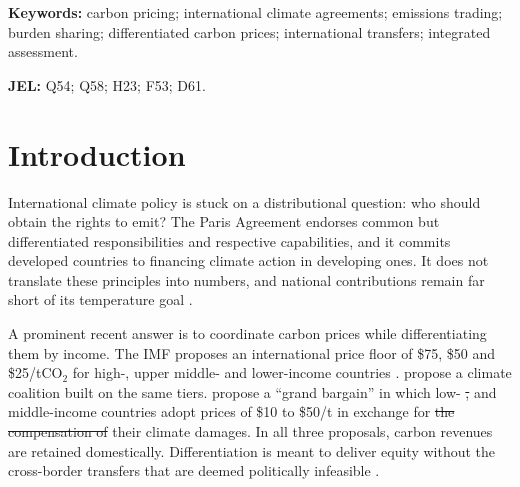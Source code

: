 \documentclass[12pt,english]{article}
\newif\ifblind
\theoremstyle{remark}
\providecommand{\DIFaddtex}[1]{{\protect\color{blue}\uwave{#1}}} %
\providecommand{\DIFdeltex}[1]{{\protect\color{red}\sout{#1}}}                      %
\providecommand{\DIFaddbegin}{} %
\providecommand{\DIFaddend}{} %
\providecommand{\DIFdelbegin}{} %
\providecommand{\DIFdelend}{} %
\providecommand{\DIFadd}[1]{\texorpdfstring{\DIFaddtex{#1}}{#1}} %
\providecommand{\DIFdel}[1]{\texorpdfstring{\DIFdeltex{#1}}{}} %
\newcommand{\DIFscaledelfig}{0.5}
\newlength{\DIFdelgraphicswidth} %
\newlength{\DIFdelgraphicsheight} %
\newcommand{\DIFaddincludegraphics}[2][]{{\color{blue}\fbox{\DIFOincludegraphics[#1]{#2}}}} %
\newcommand{\DIFdelincludegraphics}[2][]{%
\sbox{\DIFdelgraphicsbox}{\DIFOincludegraphics[#1]{#2}}%
\settoboxwidth{\DIFdelgraphicswidth}{\DIFdelgraphicsbox} %
\settoboxtotalheight{\DIFdelgraphicsheight}{\DIFdelgraphicsbox} %
\scalebox{\DIFscaledelfig}{%
\parbox[b]{\DIFdelgraphicswidth}{\usebox{\DIFdelgraphicsbox}\\[-\baselineskip] \rule{\DIFdelgraphicswidth}{0em}}\llap{\resizebox{\DIFdelgraphicswidth}{\DIFdelgraphicsheight}{%
\setlength{\unitlength}{\DIFdelgraphicswidth}%
\begin{picture}(1,1)%
\thicklines\linethickness{2pt} %
{\color[rgb]{1,0,0}\put(0,0){\framebox(1,1){}}}%
{\color[rgb]{1,0,0}\put(0,0){\line( 1,1){1}}}%
{\color[rgb]{1,0,0}\put(0,1){\line(1,-1){1}}}%
\end{picture}%
}\hspace*{3pt}}} %
} %
\DeclareRobustCommand{\DIFaddbegin}{\DIFOaddbegin \let\includegraphics\DIFaddincludegraphics} %
\DeclareRobustCommand{\DIFaddend}{\DIFOaddend \let\includegraphics\DIFOincludegraphics} %
\DeclareRobustCommand{\DIFdelbegin}{\DIFOdelbegin \let\includegraphics\DIFdelincludegraphics} %
\DeclareRobustCommand{\DIFdelend}{\DIFOaddend \let\includegraphics\DIFOincludegraphics} %
\begin{document}
\medskip
\noindent\textbf{Keywords:} carbon pricing; international climate agreements; emissions trading; burden sharing; differentiated carbon prices; international transfers; integrated assessment.

\noindent\textbf{JEL:} Q54; Q58; H23; F53; D61.


\clearpage

\ifblind
  \doublespacing
  \linenumbers
\else
  \tableofcontents
\fi

\section{Introduction}
\label{sec:intro}

International climate policy is stuck on a distributional question: who should obtain the rights to emit? The Paris Agreement endorses common but differentiated responsibilities and respective capabilities, and it commits developed countries to financing climate action in developing ones. It does not translate these principles into numbers, and national contributions remain far short of its temperature goal \citep{unep_emissions_2025}.

A prominent recent answer is to coordinate carbon prices while differentiating them by income. The IMF proposes an international price floor of \$75, \$50 and \$25/tCO$_2$ for high-, upper middle- and lower-income countries \citep{parry_proposal_2021}. \citet{wolfram_building_2025} propose a climate coalition built on the same tiers. \citet{banerjee_grand_2025} propose a ``grand bargain'' in which low- \DIFdelbegin \DIFdel{, }\DIFdelend and middle-income countries adopt prices of \$10 to \$50/t in exchange for \DIFdelbegin \DIFdel{the compensation of }\DIFdelend \DIFaddbegin \DIFadd{compensation for }\DIFaddend their climate damages. In all three proposals, carbon revenues are retained domestically. Differentiation is meant to deliver equity without the cross-border transfers that are deemed politically infeasible \citep{parry_proposal_2021}.
\end{document}
